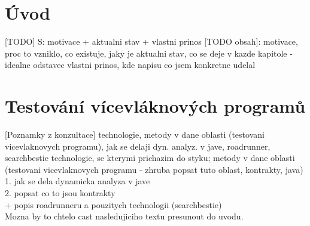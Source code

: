 
\chapter{Úvod}

[TODO] S: motivace + aktualni stav + vlastni prinos
[TODO obsah]: motivace, proc to vzniklo, co existuje, jaky je aktualni stav, co se deje v kazde kapitole
 - idealne odstavec vlastni prinos, kde napisu co jsem konkretne udelal 



\chapter{Testování vícevláknových programů}

[Poznamky z konzultace] technologie, metody v dane oblasti (testovani vicevlaknovych programu), jak se delaji dyn. analyz. v jave, roadrunner, searchbestie
technologie, se kterymi prichazim do styku; metody v dane oblasti (testovani vicevlaknovych programu - zhruba popsat tuto oblast, kontrakty, java)\\
1. jak se dela dynamicka analyza v jave\\
2. popsat co to jsou kontrakty\\
	+ popis roadrunneru a pouzitych technologii (searchbestie)\\
Mozna by to chtelo cast nasledujiciho textu presunout do uvodu.

